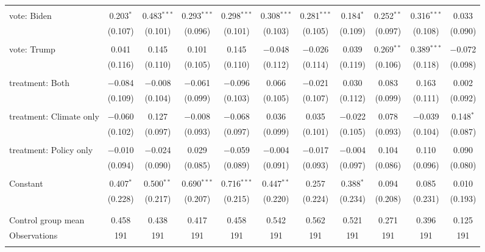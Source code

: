 \begin{tabular}{@{\extracolsep{5pt}}lcccccccccc}
  & & & & & & & & & & \\ 
 vote: Biden & 0.203$^{*}$ & 0.483$^{***}$ & 0.293$^{***}$ & 0.298$^{***}$ & 0.308$^{***}$ & 0.281$^{***}$ & 0.184$^{*}$ & 0.252$^{**}$ & 0.316$^{***}$ & 0.033 \\ 
  & (0.107) & (0.101) & (0.096) & (0.101) & (0.103) & (0.105) & (0.109) & (0.097) & (0.108) & (0.090) \\ 
  & & & & & & & & & & \\ 
 vote: Trump & 0.041 & 0.145 & 0.101 & 0.145 & $-$0.048 & $-$0.026 & 0.039 & 0.269$^{**}$ & 0.389$^{***}$ & $-$0.072 \\ 
  & (0.116) & (0.110) & (0.105) & (0.110) & (0.112) & (0.114) & (0.119) & (0.106) & (0.118) & (0.098) \\ 
  & & & & & & & & & & \\ 
 treatment: Both & $-$0.084 & $-$0.008 & $-$0.061 & $-$0.096 & 0.066 & $-$0.021 & 0.030 & 0.083 & 0.163 & 0.002 \\ 
  & (0.109) & (0.104) & (0.099) & (0.103) & (0.105) & (0.107) & (0.112) & (0.099) & (0.111) & (0.092) \\ 
  & & & & & & & & & & \\ 
 treatment: Climate only & $-$0.060 & 0.127 & $-$0.008 & $-$0.068 & 0.036 & 0.035 & $-$0.022 & 0.078 & $-$0.039 & 0.148$^{*}$ \\ 
  & (0.102) & (0.097) & (0.093) & (0.097) & (0.099) & (0.101) & (0.105) & (0.093) & (0.104) & (0.087) \\ 
  & & & & & & & & & & \\ 
 treatment: Policy only & $-$0.010 & $-$0.024 & 0.029 & $-$0.059 & $-$0.004 & $-$0.017 & $-$0.004 & 0.104 & 0.110 & 0.090 \\ 
  & (0.094) & (0.090) & (0.085) & (0.089) & (0.091) & (0.093) & (0.097) & (0.086) & (0.096) & (0.080) \\ 
  & & & & & & & & & & \\ 
 Constant & 0.407$^{*}$ & 0.500$^{**}$ & 0.690$^{***}$ & 0.716$^{***}$ & 0.447$^{**}$ & 0.257 & 0.388$^{*}$ & 0.094 & 0.085 & 0.010 \\ 
  & (0.228) & (0.217) & (0.207) & (0.215) & (0.220) & (0.224) & (0.234) & (0.208) & (0.231) & (0.193) \\ 
  & & & & & & & & & & \\ 
\hline \\[-1.8ex] 
Control group mean & 0.458 & 0.438 & 0.417 & 0.458 & 0.542 & 0.562 & 0.521 & 0.271 & 0.396 & 0.125 \\ 
Observations & 191 & 191 & 191 & 191 & 191 & 191 & 191 & 191 & 191 & 191 \\ 
\hline 
\hline \\[-1.8ex] 
\end{tabular} 
